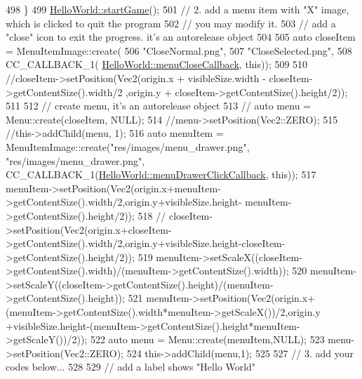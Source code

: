 \begin{DoxyCode}
498     \}
499     \hyperlink{class_hello_world_aa4c36099096e160e3726819a2308dd04}{HelloWorld::startGame}();
501     \textcolor{comment}{// 2. add a menu item with "X" image, which is clicked to quit the program}
502     \textcolor{comment}{//    you may modify it.}
503     \textcolor{comment}{// add a "close" icon to exit the progress. it's an autorelease object}
504     
505     \textcolor{keyword}{auto} closeItem = MenuItemImage::create(
506                                            \textcolor{stringliteral}{"CloseNormal.png"},
507                                            \textcolor{stringliteral}{"CloseSelected.png"},
508                                            CC\_CALLBACK\_1(
      \hyperlink{class_hello_world_ac4ab2f5e922e659d4f137591c0f6a9b0}{HelloWorld::menuCloseCallback}, \textcolor{keyword}{this}));
509     
510     \textcolor{comment}{//closeItem->setPosition(Vec2(origin.x + visibleSize.width - closeItem->getContentSize().width/2
       ,origin.y + closeItem->getContentSize().height/2));}
511 
512     \textcolor{comment}{// create menu, it's an autorelease object}
513    \textcolor{comment}{// auto menu = Menu::create(closeItem, NULL);}
514     \textcolor{comment}{//menu->setPosition(Vec2::ZERO);}
515     \textcolor{comment}{//this->addChild(menu, 1);}
516     \textcolor{keyword}{auto} menuItem = MenuItemImage::create(\textcolor{stringliteral}{"res/images/menu\_drawer.png"}, \textcolor{stringliteral}{"res/images/menu\_drawer.png"}, 
      CC\_CALLBACK\_1(\hyperlink{class_hello_world_a1609fd202ff4b899571aeb34b3cdaed4}{HelloWorld::menuDrawerClickCallback}, \textcolor{keyword}{this}));
517     menuItem->setPosition(Vec2(origin.x+menuItem->getContentSize().width/2,origin.y+visibleSize.height-
      menuItem->getContentSize().height/2));
518      \textcolor{comment}{//
      closeItem->setPosition(Vec2(origin.x+closeItem->getContentSize().width/2,origin.y+visibleSize.height-closeItem->getContentSize().height/2));}
519     menuItem->setScaleX((closeItem->getContentSize().width)/(menuItem->getContentSize().width));
520     menuItem->setScaleY((closeItem->getContentSize().height)/(menuItem->getContentSize().height));
521     menuItem->setPosition(Vec2(origin.x+(menuItem->getContentSize().width*menuItem->getScaleX())/2,origin.y
      +visibleSize.height-(menuItem->getContentSize().height*menuItem->getScaleY())/2));
522     \textcolor{keyword}{auto} menu = Menu::create(menuItem,NULL);
523     menu->setPosition(Vec2::ZERO);
524     this->addChild(menu,1);
525     
527     \textcolor{comment}{// 3. add your codes below...}
528 
529     \textcolor{comment}{// add a label shows "Hello World"}

\end{DoxyCode}
